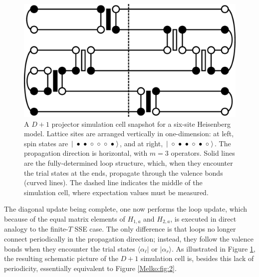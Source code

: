 \documentclass[vecphys]{svmult}
\begin{document}
\begin{figure}[t]
\centering
\includegraphics*[width=.85\textwidth]{zeroT_heis.eps}
\caption[]{ A $D+1$ projector simulation cell snapshot for a six-site Heisenberg model.  Lattice sites are arranged vertically in one-dimension: 
at left, spin states are $ |  \hspace{1mm} \bullet  \hspace{1mm} \bullet  \hspace{1mm} \circ  \hspace{1mm} \circ  \hspace{1mm} \circ  \hspace{1mm} \bullet  \hspace{1mm} \rangle$, and at right,  $ |  \hspace{1mm} \circ  \hspace{1mm} \bullet  \hspace{1mm} \bullet  \hspace{1mm} \circ  \hspace{1mm} \bullet  \hspace{1mm} \circ \hspace{1mm}  \rangle$.
The propagation direction is horizontal, with $m=3$ operators.  Solid lines are the fully-determined loop structure, which, when they encounter the trial states at the ends, propagate through the valence bonds (curved lines).  The dashed line indicates the middle of the simulation cell, where expectation values must be measured.}
\label{Melko:fig:3}       
\end{figure} 

The diagonal update being complete, one now performs the loop update, which because of the equal matrix elements of $H_{1,a}$ and $H_{2,a}$, is executed in direct analogy to the finite-$T$ SSE case.  The only difference is that loops no longer connect periodically in the propagation direction; instead, they follow the valence bonds when they encounter the trial states $\langle \alpha_{\ell} |$ or $| \alpha_r \rangle$.  As illustrated in Figure \ref{Melko:fig:3}, the resulting schematic picture of the $D+1$ simulation cell is, besides this lack of periodicity, essentially equivalent to Figure \ref{Melko:fig:2}.
\end{document}
